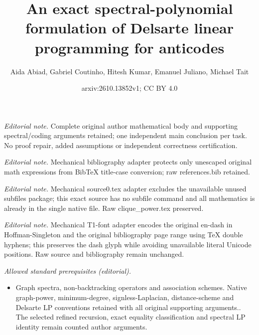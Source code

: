 \documentclass[10pt,a4paper]{article}
\title{An exact spectral-polynomial formulation of Delsarte linear programming for anticodes}
\author{Aida Abiad, Gabriel Coutinho, Hitesh Kumar, Emanuel Juliano, Michael Tait}
\date{arxiv:2610.13852v1; CC BY 4.0}
\theoremstyle{plain}
\numberwithin{equation}{section}
\begin{document}
\maketitle
\noindent\textit{Editorial note.} Complete original author mathematical body and supporting spectral/coding arguments retained; one independent main conclusion per task. No proof repair, added assumptions or independent correctness certification.\par\medskip
\noindent\textit{Editorial note.} Mechanical bibliography adapter protects only unescaped original math expressions from BibTeX title-case conversion; raw references.bib retained.\par\medskip
\noindent\textit{Editorial note.} Mechanical source0.tex adapter excludes the unavailable unused subfiles package; this exact source has no subfile command and all mathematics is already in the single native file. Raw clique\_power.tex preserved.\par\medskip
\noindent\textit{Editorial note.} Mechanical T1-font adapter encodes the original en-dash in Hoffman-Singleton and the original bibliography page range using TeX double hyphens; this preserves the dash glyph while avoiding unavailable literal Unicode positions. Raw source and bibliography remain unchanged.\par\medskip
\noindent\textit{Allowed standard prerequisites (editorial).}\begin{itemize}
\item Graph spectra, non-backtracking operators and association schemes. Native graph-power, minimum-degree, signless-Laplacian, distance-scheme and Delsarte LP conventions retained with all original supporting arguments.. The selected refined recursion, exact equality classification and spectral LP identity remain counted author arguments.
\end{itemize}\medskip
\end{document}
